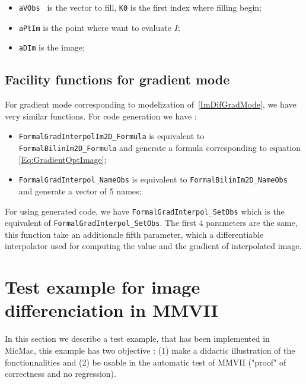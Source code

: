 \begin{itemize}
    \item {\tt aVObs } is the vector to fill, {\tt K0} is the first index where filling begin;
    \item {\tt aPtIm}  is the point where want to evaluate $I$;
    \item {\tt aDIm}  is the image;
\end{itemize}

\subsection{Facility functions for gradient  mode}

For gradient mode corresponding to modelization of~\ref{ImDifGradMode}, we have very similar functions.
For code generation we have :

\begin{itemize}
   \item  {\tt FormalGradInterpolIm2D\_Formula} is equivalent to {\tt FormalBilinIm2D\_Formula} and 
          generate a formula corresponding to equation \ref{Eq:GradientOptImage};

   \item {\tt FormalGradInterpol\_NameObs} is equivalent to {\tt FormalBilinIm2D\_NameObs} and generate
         a vector of $5$ names;
\end{itemize}

For  using generated code, we have {\tt FormalGradInterpol\_SetObs} which is the equivalent 
of {\tt FormalGradInterpol\_SetObs}.  The first $4$ parameters are the same, this function
take an additionale fifth parameter, which a differentiable interpolator used for computing
the  value and the gradient of interpolated image.



\section{Test example for image differenciation in MMVII}
\label{SampleImageDiff}

In this section we describe a test example, that has been implemented in MicMac, this example 
has two objective : (1) make a didactic illustration of the fonctionnalities and (2) 
be usable in the automatic test of MMVII ("proof" of correctness and no regression).

